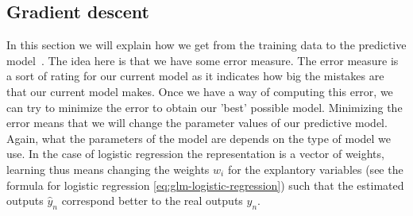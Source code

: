 \subsection{Gradient descent}
\label{subsec:glm-gradient-descent}
In this section we will explain how we get from the training data to the predictive model~\cite{caltechmachinelearning}\cite{wikigd}\cite{gradientdescentvariants}. The idea here is that we have some error measure. The error measure is a sort of rating for our current model as it indicates how big the mistakes are that our current model makes. Once we have a way of computing this error, we can try to minimize the error to obtain our 'best' possible model. Minimizing the error means that we will change the parameter values of our predictive model. Again, what the parameters of the model are depends on the type of model we use. In the case of logistic regression the representation is a vector of weights, learning thus means changing the weights $w_{i}$ for the explantory variables (see the formula for logistic regression \ref{eq:glm-logistic-regression}) such that the estimated outputs $\hat{y}_{n}$ correspond better to the real outputs $y_{n}$.
